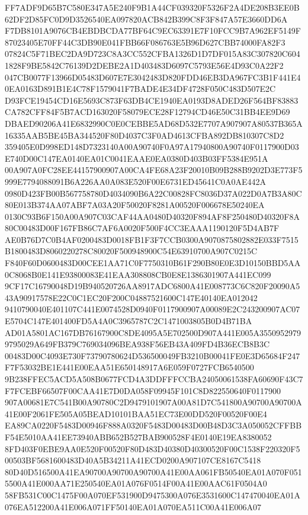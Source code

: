 \documentclass[UTF8,fontset=fandol,zihao=-4,a4paper]{ctexart}
\begin{document}
{{FF7ADF9D65B7C580E347A5E240F9B1A44CF039320F5326F2A4DE208B3EE0B62DF2D85FC0D9D3526540EA097820ACB842B399C8F3F847A57E3660DD6A
F7DB8101A9076CB4EBDBCDA77BF64C9EC63391E7F10FCC9B7A962EF5149F87023405E70FF44C3DB90E041FBB66F086763E5B96D627CBB74000FA82F3
07824C5F71BEC2DA9D723C8A3CC552CFBA1326D1D7DF015A83C307820C6041828F9BE5842C76139D2DEBE2A1D403483D6097C5793E56E4D93C0A22F2
047CB0077F13966D05483D607E7E3042483D820FDD46EB3DA967FC3B1F441E40EA0163D891B1E4C78F1579041F7BADE4E34DF4728F050C483D507E2C
D93FCE19454CD16E5693C873F63DB4CE1940EA0193D8ADED26F564BF83883CA782CFF84F5B7ACD163020F58079ECE28F12794CD46E50C31BB4EE9D69
DBAED90206A41E6832990C0E0CEBBE5AD68D532E7707A907907A80537B365A16335AAB5BE45BA344520F80D4037C3F0AD4613CFBA892DB810307C8D2
359405E0D998ED148D7323140A00A90740F0A97A17940800A90740F0117900D03E740D00C147EA0140EA01C0041EAAE0EA0380D403B03FF5384E951A
00A907A0FC28EE44157900907A00CA4FE68A23F20010B09B288B9202D3E773F5999E7794088091B6A226AA0A083E520F00E6731ED45641C0A0AE442A
0980D423FB00B567758780D4034090B6A22C00828FC8036D37A022D0A7B3A80C80E013B374AA07ABF7A03A20F50020F8281A00520F006678E50240EA
0130C93B6F150A00A907C03CAF44AA0480D40320F894AF8F250480D40320F8A80C00483D00F167FB86C7AF6A0020F500F4CC3EAAA1190120F5D4AB7F
AE0B76D7C0B4AF0200483D0018FB1F3F7CCB0300A9070875802882E033F7515B1800483D8060220278C80020F500948900C54E63910700A907C0215C
F840F60D0600483D00CEE1AA71C0F7750310B61F290B80E0E3D10150BBD5AA0C8068B0E141E93800083E41EAA308808CB0E8E1386301907A441EC099
9CF17C16790048D19B940520726AA8917ADC6800A41E008773C6C820F20090A543A90917578E22C0C1EC20F200C04887521600C147E40140EA012042
9410790040E401107C441E0074528D0940F0117900907A00089E2C243200907AC07E5704C147E401400FD5A4A0C3965787C2C1471003805B0D4B71BA
AD01A5801AC167DB76167900C8DE4095A5E702500D907A441E005A35509529799795029A649FB379C769034096BEA938F56EB43A409FD4B36ECB8B3C
00483D00C4093E730F73790780624D536500049FB3210B00041FE0E3D65684F247F7F53032BE1E441E00EAA51E650148917A6E059F0727FCB6540500
9B238FFEC5ACD5A508B0677FCD4A3DDFFFCCBA24050061538FA60690F43C7F7FCEBF66507F00CAA41E7D0DA058F09945F101C8D822550640F0117900
907A00681E7C541B00A90780C2D9479101907A00A81D7C541800A90700A90700A41E00F2061FE505A05BEAD10101BAA51EC73E00DD520F00520F00E4
EA89CA0220F5483D00946F888A0320F5483D00483D00B48D3C3A050052CFFBBF54E5010AA41EE73940ABB652B527BAB900528F4E0140E19EA8380052
8FD403F0EBE9AA0E520F00520F80D483D40380D40300520F00C1538F220320F500503BF5681600483D40A5B34211A41ECD0200A907107CE8167C5418
80D40D516500A41EA90700A90700A90700A41E00AA061FB50540EA01A070F0515500A41E000AA71E250540EA01A076F0514F00A41E00AAC61F0504A0
58FB531C00C1475F00A070EF531900D9475300A076E3531600C147470040EA01A076EA512200A41E006A071FF50140EA01A070EA511C00A41E006A07
}}
\end{document}
